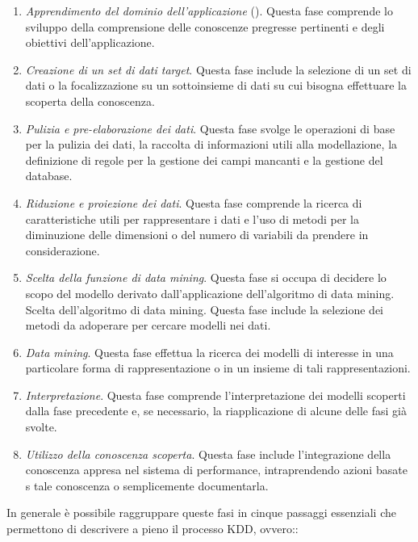\begin{enumerate}
    \item \textit{Apprendimento del dominio dell'applicazione} (). Questa fase comprende lo sviluppo della comprensione delle conoscenze pregresse pertinenti e degli obiettivi dell'applicazione.
    \item \textit{Creazione di un set di dati target}. Questa fase include la selezione di un set di dati o la focalizzazione su un sottoinsieme di dati su cui bisogna effettuare la scoperta della conoscenza.
    \item \textit{Pulizia e pre-elaborazione dei dati}. Questa fase svolge le operazioni di base per la pulizia dei dati, la raccolta di informazioni utili alla modellazione, la definizione di regole per la gestione dei campi mancanti e la gestione del database.
    \item \textit{Riduzione e proiezione dei dati}. Questa fase comprende la ricerca di caratteristiche utili per rappresentare i dati e l'uso di metodi per la diminuzione delle dimensioni o del numero di variabili da prendere in considerazione.
    \item \textit{Scelta della funzione di data mining}. Questa fase si occupa di decidere lo scopo del modello derivato dall'applicazione dell'algoritmo di data mining.
    Scelta dell'algoritmo di data mining. Questa fase include la selezione dei metodi da adoperare per cercare modelli nei dati.
    \item \textit{Data mining}. Questa fase effettua la ricerca dei modelli di interesse in una particolare forma di rappresentazione o in un insieme di tali rappresentazioni.
    \item \textit{Interpretazione}. Questa fase comprende l'interpretazione dei modelli scoperti dalla fase precedente e, se necessario, la riapplicazione di alcune delle fasi già svolte.
    \item \textit{Utilizzo della conoscenza scoperta}. Questa fase include l'integrazione della conoscenza appresa nel sistema di performance, intraprendendo azioni basate s tale conoscenza o semplicemente documentarla.
\end{enumerate}

In generale è possibile raggruppare queste fasi in cinque passaggi essenziali che permettono di descrivere a pieno il processo KDD, ovvero:\cite{knowledge_science}:

